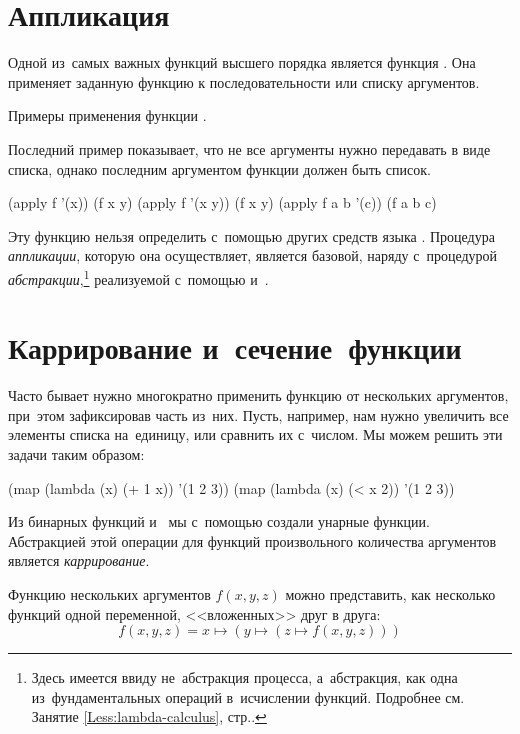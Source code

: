 \section[2]{Аппликация}%
%
Одной из~самых важных функций высшего порядка является функция . Она применяет заданную функцию к последовательности или списку аргументов.

\begin{example}{%
  Примеры применения функции .

  Последний пример показывает, что не все аргументы нужно передавать в виде списка, однако последним аргументом функции  должен быть список.}
  \REPL
    {(apply f '(x))}
    {(f x y)}
  \REPL
    {(apply f '(x y))}
    {(f x y)}
  \REPL
    {(apply f a b '(c))}
    {(f a b c)}
\end{example}

Эту функцию нельзя определить с~помощью других средств языка \Scheme. Процедура \emph{аппликации}, которую она осуществляет, является базовой, наряду с~процедурой \emph{абстракции},\footnote{Здесь имеется ввиду не~абстракция процесса, а~абстракция, как одна из~фундаментальных операций в~исчислении функций. Подробнее см.\,Занятие \ref{Less:lambda-calculus}, стр.\pageref{abstraction}.} реализуемой с~помощью  и~.


\section{Каррирование и~сечение~функции}%
Часто бывает нужно многократно применить функцию от нескольких аргументов, при~этом зафиксировав часть из~них. Пусть, например, нам нужно увеличить все элементы списка на~единицу, или сравнить их с~числом. Мы можем решить эти задачи таким образом:

\begin{SchemeCode}
(map (lambda (x) (+ 1 x)) '(1 2 3))
(map (lambda (x) (< x 2)) '(1 2 3))
\end{SchemeCode}

\noindent%
Из бинарных функций \s{+} и~\s{<} мы с~помощью  создали унарные функции. Абстракцией этой операции для функций произвольного количества аргументов является \emph{каррирование}.

Функцию нескольких аргументов $f(x, y, z)$ можно представить, как несколько функций одной переменной, <<вложенных>> друг в друга:$$f(x, y, z) = x \mapsto (y \mapsto (z \mapsto f (x, y, z)))$$

